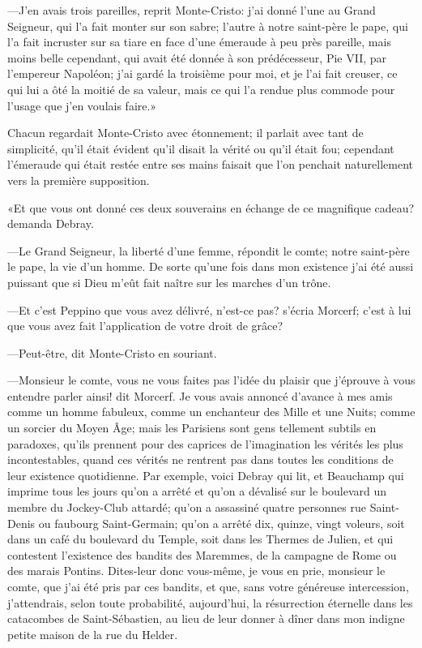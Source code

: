 —J'en avais trois pareilles, reprit Monte-Cristo: j'ai donné l'une au Grand Seigneur, qui l'a fait monter sur son sabre; l'autre à notre saint-père le pape, qui l'a fait incruster sur sa tiare en face d'une émeraude à peu près pareille, mais moins belle cependant, qui avait été donnée à son prédécesseur, Pie VII, par l'empereur Napoléon; j'ai gardé la troisième pour moi, et je l'ai fait creuser, ce qui lui a ôté la moitié de sa valeur, mais ce qui l'a rendue plus commode pour l'usage que j'en voulais faire.» 

Chacun regardait Monte-Cristo avec étonnement; il parlait avec tant de simplicité, qu'il était évident qu'il disait la vérité ou qu'il était fou; cependant l'émeraude qui était restée entre ses mains faisait que l'on penchait naturellement vers la première supposition. 

«Et que vous ont donné ces deux souverains en échange de ce magnifique cadeau? demanda Debray. 

—Le Grand Seigneur, la liberté d'une femme, répondit le comte; notre saint-père le pape, la vie d'un homme. De sorte qu'une fois dans mon existence j'ai été aussi puissant que si Dieu m'eût fait naître sur les marches d'un trône. 

—Et c'est Peppino que vous avez délivré, n'est-ce pas? s'écria Morcerf; c'est à lui que vous avez fait l'application de votre droit de grâce? 

—Peut-être, dit Monte-Cristo en souriant.  

—Monsieur le comte, vous ne vous faites pas l'idée du plaisir que j'éprouve à vous entendre parler ainsi! dit Morcerf. Je vous avais annoncé d'avance à mes amis comme un homme fabuleux, comme un enchanteur des Mille et une Nuits; comme un sorcier du Moyen Âge; mais les Parisiens sont gens tellement subtils en paradoxes, qu'ils prennent pour des caprices de l'imagination les vérités les plus incontestables, quand ces vérités ne rentrent pas dans toutes les conditions de leur existence quotidienne. Par exemple, voici Debray qui lit, et Beauchamp qui imprime tous les jours qu'on a arrêté et qu'on a dévalisé sur le boulevard un membre du Jockey-Club attardé; qu'on a assassiné quatre personnes rue Saint-Denis ou faubourg Saint-Germain; qu'on a arrêté dix, quinze, vingt voleurs, soit dans un café du boulevard du Temple, soit dans les Thermes de Julien, et qui contestent l'existence des bandits des Maremmes, de la campagne de Rome ou des marais Pontins. Dites-leur donc vous-même, je vous en prie, monsieur le comte, que j'ai été pris par ces bandits, et que, sans votre généreuse intercession, j'attendrais, selon toute probabilité, aujourd'hui, la résurrection éternelle dans les catacombes de Saint-Sébastien, au lieu de leur donner à dîner dans mon indigne petite maison de la rue du Helder. 


